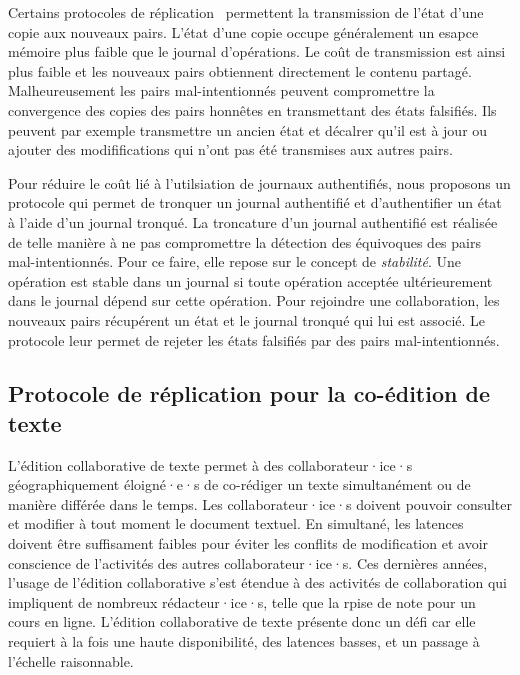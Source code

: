 Certains protocoles de réplication~\autocite{feldman2010sporc,almeida_2018_delta-crdt-revisited} permettent la transmission de l'état d'une copie aux nouveaux pairs.
L'état d'une copie occupe généralement un esapce mémoire plus faible que le journal d'opérations.
Le coût de transmission est ainsi plus faible et les nouveaux pairs obtiennent directement le contenu partagé.
Malheureusement les pairs mal-intentionnés peuvent compromettre la convergence des copies des pairs honnêtes en transmettant des états falsifiés.
Ils peuvent par exemple transmettre un ancien état et décalrer qu'il est à jour ou ajouter des modififications qui n'ont pas été transmises aux autres pairs.

Pour réduire le coût lié à l'utilsiation de journaux authentifiés, nous proposons un protocole qui permet de tronquer un journal authentifié et d'authentifier un état à l'aide d'un journal tronqué.
La troncature d'un journal authentifié est réalisée de telle manière à ne pas compromettre la détection des équivoques des pairs mal-intentionnés.
Pour ce faire, elle repose sur le concept de \emph{stabilité}.
Une opération est stable dans un journal si toute opération acceptée ultérieurement dans le journal dépend sur cette opération.
Pour rejoindre une collaboration, les nouveaux pairs récupérent un état et le journal tronqué qui lui est associé.
Le protocole leur permet de rejeter les états falsifiés par des pairs mal-intentionnés.


\subsection{Protocole de réplication pour la co-édition de texte}


L'édition collaborative de texte permet à des collaborateur·ice·s géographiquement éloigné·e·s de co-rédiger un texte simultanément ou de manière différée dans le temps.
Les collaborateur·ice·s doivent pouvoir consulter et modifier à tout moment le document textuel.
En simultané, les latences doivent être suffisament faibles pour éviter les conflits de modification et avoir conscience de l'activités des autres collaborateur·ice·s.
Ces dernières années, l'usage de l'édition collaborative s'est étendue à des activités de collaboration qui impliquent de nombreux rédacteur·ice·s, telle que la rpise de note pour un cours en ligne.
L'édition collaborative de texte présente donc un défi car elle requiert à la fois une haute disponibilité, des latences basses, et un passage à l'échelle raisonnable.

